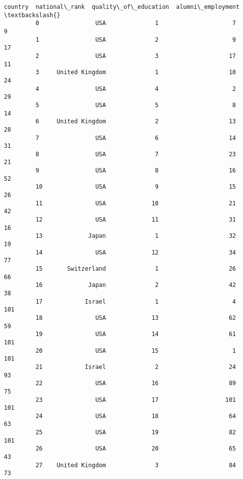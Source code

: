 \documentclass[11pt]{article}
\begin{document}
\begin{Verbatim}[commandchars=\\\{\}]
                      country  national\_rank  quality\_of\_education  alumni\_employment  \textbackslash{}
         0                USA              1                     7                  9   
         1                USA              2                     9                 17   
         2                USA              3                    17                 11   
         3     United Kingdom              1                    10                 24   
         4                USA              4                     2                 29   
         5                USA              5                     8                 14   
         6     United Kingdom              2                    13                 28   
         7                USA              6                    14                 31   
         8                USA              7                    23                 21   
         9                USA              8                    16                 52   
         10               USA              9                    15                 26   
         11               USA             10                    21                 42   
         12               USA             11                    31                 16   
         13             Japan              1                    32                 19   
         14               USA             12                    34                 77   
         15       Switzerland              1                    26                 66   
         16             Japan              2                    42                 38   
         17            Israel              1                     4                101   
         18               USA             13                    62                 59   
         19               USA             14                    61                101   
         20               USA             15                     1                101   
         21            Israel              2                    24                 93   
         22               USA             16                    89                 75   
         23               USA             17                   101                101   
         24               USA             18                    64                 63   
         25               USA             19                    82                101   
         26               USA             20                    65                 43   
         27    United Kingdom              3                    84                 73   

\end{Verbatim}
\end{document}
